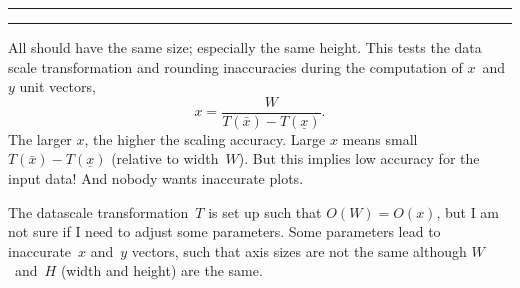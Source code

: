 \starttikzpicture
\startaxis
\smallplotstest
\stopaxis
\stoptikzpicture


\starttikzpicture
\startaxis[width=5cm]
\smallplotstest
\stopaxis
\stoptikzpicture



\starttikzpicture
\startaxis[height=3cm]
\smallplotstest
\stopaxis
\stoptikzpicture

\hrule width3cm height1pt
\vskip10pt
\starttikzpicture[baseline]
\startaxis[x=3cm]
\smallplotstest
\stopaxis
\stoptikzpicture

\hrule width3cm height1pt
\noindent
\vrule height4cm width1pt
\hskip10pt
\starttikzpicture[baseline]
\startaxis[x=3cm,y=4cm]
\smallplotstest
\stopaxis
\stoptikzpicture

\noindent
\vrule height3cm width1pt
\hskip10pt
\starttikzpicture[baseline]
\startaxis[y=3cm]
\smallplotstest
\stopaxis
\stoptikzpicture

All should have the same size; especially the same height.
This tests the data scale transformation and rounding inaccuracies during the computation of $x$~and~$y$ unit vectors,
$$ x = \frac{W}{T(\bar x) - T(\underline x)}. $$
The larger $x$, the higher the scaling accuracy. Large $x$ means small $T(\bar x) - T(\underline x)$ (relative to width~$W$). But this implies low accuracy for the input data! And nobody wants inaccurate plots.

The datascale transformation~$T$ is set up such that $O(W) = O(x)$, but I am not sure if I need to adjust some parameters. Some parameters lead to inaccurate~$x$ and~$y$ vectors, such that axis sizes are {not} the same although $W$~and~$H$ (width and height) are the same.


